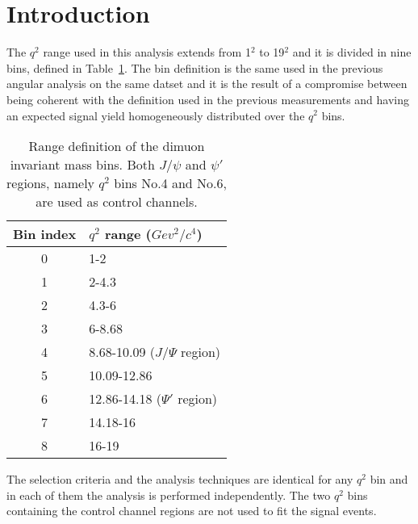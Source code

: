\section{Introduction}




The $q^2$ range used in this analysis extends from 1\GeV$^2$ to 19\GeV$^2$ and it is divided in nine bins, defined in Table~\ref{tab:q2bins}.
The bin definition is the same used in the previous angular analysis on the same datset and it is the result of a compromise between being coherent with the definition used in the previous measurements and having an expected signal yield homogeneously distributed over the $q^2$ bins.

\begin{table}[!htb]
  \begin{center}
    \begin{small}
      \caption{Range definition of the dimuon invariant mass bins. Both $J/\psi$ and $\psi'$ regions, namely $q^2$ bins No.4 and No.6, are used as control channels.
        \label{tab:q2bins}}
      \begin{tabular}{c|l}
        Bin index & $q^2$ range ($Gev^2/c^4$) \\
        \hline
        0 & 1-2  \\
        1 & 2-4.3  \\
        2 & 4.3-6  \\
        3 & 6-8.68   \\
        4 & 8.68-10.09 ($J/\Psi$ region) \\
        5 & 10.09-12.86\\
        6 & 12.86-14.18 ($\Psi'$ region)\\
        7 & 14.18-16\\
        8 & 16-19\\
      \end{tabular}
    \end{small}
  \end{center}
\end{table}

The selection criteria and the analysis techniques are identical for any $q^2$ bin and in each of them the analysis is performed independently.
The two $q^2$ bins containing the control channel regions are not used to fit the signal events.

